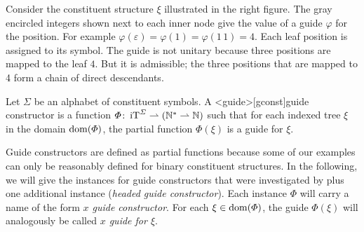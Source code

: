 \documentclass[../../document.tex]{subfiles}
\begin{document}
    \bigskip

    \begin{wrapfigure}[6]{r}{.3\linewidth}
        
    \end{wrapfigure}
    \parexample*
    Consider the constituent structure \(\xi\) illustrated in the right figure.
    The gray encircled integers shown next to each inner node give the value of a guide \(\varphi\) for the position.
    For example \(\varphi(\varepsilon) = \varphi(1) = \varphi(1\,1) = 4\).
    Each leaf position is assigned to its symbol.
    The guide is not unitary because three positions are mapped to the leaf $4$.
    But it is admissible; the three positions that are mapped to 4 form a chain of direct descendants.
    \\\null\exampleqed

    \begin{definition}
        Let \(\varSigma\) be an alphabet of constituent symbols.
        A <guide>[gconst]{guide constructor} is a function \(\varPhi\colon \operatorname{iT}^\varSigma \rightharpoonup (\mathbb{N}^* \rightharpoonup \mathbb{N})\) such that for each indexed tree \(\xi\) in the domain \(\operatorname{dom}(\varPhi)\), the partial function \(\varPhi(\xi)\) is a guide for \(\xi\).
    \end{definition}

    Guide constructors are defined as partial functions because some of our examples can only be reasonably defined for binary constituent structures.
    In the following, we will give the instances for guide constructors that were investigated by \citet{Rup22} plus one additional instance (\emph{headed guide constructor}).
    Each instance \(\varPhi\) will carry a name of the form \emph{\(x\) guide constructor}.
    For each \(\xi \in \operatorname{dom}(\varPhi)\), the guide \(\varPhi(\xi)\) will analogously be called \emph{\(x\) guide for \(\xi\)}.
\end{document}
